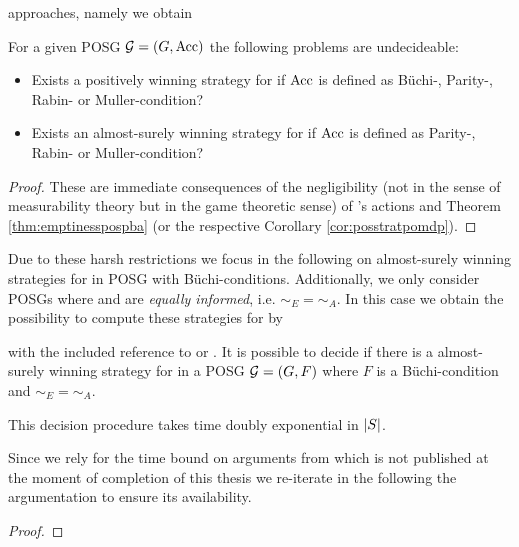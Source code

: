 approaches, namely we obtain
\begin{corollary}
  \cite{PureStratPOSG, POSG}
  For a given \ac{POSG} $\mathcal{G} = \left(G, \operatorname{Acc}\right)$ the following problems
  are undecideable:
  \begin{itemize}
    \item Exists a positively winning strategy for \eve{} if $\operatorname{Acc}$ is defined 
      as Büchi-, Parity-, Rabin- or Muller-condition?
    \item Exists an almost-surely winning strategy for \eve{} if $\operatorname{Acc}$ is
      defined as Parity-, Rabin- or Muller-condition?
  \end{itemize}
\end{corollary}
\begin{proof}
  These are immediate consequences of the negligibility (not in the sense of
  measurability theory but in the game theoretic sense) of \adam{}'s actions
  and Theorem \ref{thm:emptinesspospba} (or the respective Corollary 
  \ref{cor:posstratpomdp}).
\end{proof}
Due to these harsh restrictions we focus in the following on almost-surely 
winning strategies for \eve{} in \ac{POSG} with Büchi-conditions. Additionally,
we only consider \acp{POSG} where \eve{} and \adam{} are 
\emph{equally informed}, i.e. $\sim_{E} = \sim_{A}$. In this case
we obtain the possibility to compute these strategies for \eve{} by
\begin{theorem}
  \cite[Theorem 6]{POSG} with the included reference to 
  \cite[Lemma 4]{DecProblemsForProbAuto} or \cite[Theorem 5.3]{PureStratPOSG}.
  It is possible to decide if there is a almost-surely winning strategy for 
  \eve{} in a \ac{POSG} $\mathcal{G} = \left(G, F\right)$ where $F$ is a 
  Büchi-condition and $\sim_{E} = \sim_{A}$.

  This decision procedure takes time doubly exponential in $\left\vert{S}\right\vert$.
\end{theorem}
Since we rely for the time bound on arguments from \cite{PureStratPOSG} which 
is not published at the moment of completion of this thesis we re-iterate
in the following the argumentation to ensure its availability.
\begin{proof}
\end{proof}

